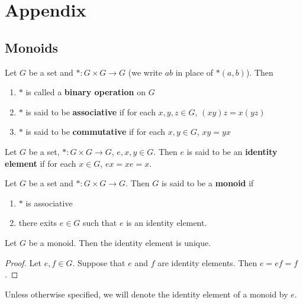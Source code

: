\documentclass{book}
\begin{document}
	\section{Appendix}
	\subsection{Monoids}
	
	\begin{defn}
	Let $G$ be a set and $*: G \times G \rightarrow G$ (we write $ab$ in place of $*(a,b)$). Then 
	\begin{enumerate}
	\item $*$ is called a \textbf{binary operation} on $G$	
	\item $*$ is said to be \textbf{associative}	if for each $x,y,z \in G$, $(xy)z = x(yz)$
	\item $*$ is said to be \textbf{commutative} if for each $x,y \in G$, $xy = yx$ 
	\end{enumerate}
	\end{defn}
	
	\begin{defn}
	Let $G$ be a set, $*: G \times G \rightarrow G$, $e,x,y \in G$. Then $e$ is said to be an \textbf{identity element} if for each $x \in G$, $ex = xe = x$.
	\end{defn}
	
	\begin{defn}
	Let $G$ be a set and $*: G \times G \rightarrow G$. Then $G$ is said to be a \textbf{monoid} if 
	\begin{enumerate}
	\item $*$ is associative
	\item there exits $e \in G$ such that $e$ is an identity element.
	\end{enumerate}
	\end{defn}	
	
	\begin{ex}
	Let $G$ be a monoid. Then the identity element is unique.
	\end{ex}
	
	\begin{proof}
	Let $e, f \in G$. Suppose that $e$ and $f$ are identity elements. Then $e = ef = f$.
	\end{proof}
	
	\begin{note}
	Unless otherwise specified, we will denote the identity element of a monoid by $e$.
	\end{note}
	
\end{document}
